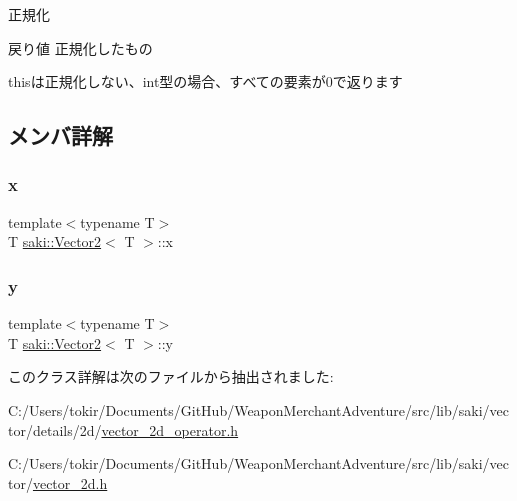 正規化 

\begin{DoxyReturn}{戻り値}
正規化したもの
\end{DoxyReturn}
thisは正規化しない、int型の場合、すべての要素が0で返ります 

\subsection{メンバ詳解}
\mbox{\label{classsaki_1_1_vector2_a69df7df6da198f35ef8ed269eb095c27}} 
\subsubsection{\texorpdfstring{x}{x}}
{\footnotesize\ttfamily template$<$typename T$>$ \\
T \mbox{\hyperlink{classsaki_1_1_vector2}{saki\+::\+Vector2}}$<$ T $>$\+::x}

\mbox{\label{classsaki_1_1_vector2_a54e83290254fb653eff9b8dcf6a10878}} 
\subsubsection{\texorpdfstring{y}{y}}
{\footnotesize\ttfamily template$<$typename T$>$ \\
T \mbox{\hyperlink{classsaki_1_1_vector2}{saki\+::\+Vector2}}$<$ T $>$\+::y}



このクラス詳解は次のファイルから抽出されました\+:\begin{DoxyCompactItemize}
\item 
C\+:/\+Users/tokir/\+Documents/\+Git\+Hub/\+Weapon\+Merchant\+Adventure/src/lib/saki/vector/details/2d/\mbox{\hyperlink{vector__2d__operator_8h}{vector\+\_\+2d\+\_\+operator.\+h}}\item 
C\+:/\+Users/tokir/\+Documents/\+Git\+Hub/\+Weapon\+Merchant\+Adventure/src/lib/saki/vector/\mbox{\hyperlink{vector__2d_8h}{vector\+\_\+2d.\+h}}\end{DoxyCompactItemize}

